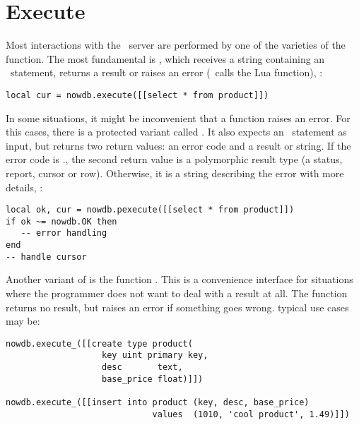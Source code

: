 
\clearpage
\section{Execute}
Most interactions with the \nowdb\ server
are performed by one of the varieties of
the  function.
The most fundamental is ,
which receives a string containing an \sql\ statement,
returns a result or raises an error (\ie\ calls
the Lua  function), \eg:

\begin{lua}
\begin{lstlisting}
local cur = nowdb.execute([[select * from product]])
\end{lstlisting}
\end{lua}

In some situations, it might be inconvenient
that a function raises an error.
For this cases, there is a protected
variant called .
It also expects an \sql\ statement
as input, but returns two return values:
an error code and a result or string.
If the error code is .,
the second return value
is a polymorphic result type
(a status, report, cursor or row).
Otherwise, it is a string describing
the error with more details, \eg:

\begin{lua}
\begin{lstlisting}
local ok, cur = nowdb.pexecute([[select * from product]])
if ok ~= nowdb.OK then
   -- error handling
end
-- handle cursor
\end{lstlisting}
\end{lua}

Another variant of  is
the function .
This is a convenience interface for
situations where the programmer does
not want to deal with a result at all.
The function returns no result, but
raises an error if something goes wrong.
typical use cases may be:

\begin{lua}
\begin{lstlisting}
nowdb.execute_([[create type product(
                   key uint primary key,
                   desc       text,
                   base_price float)]])

nowdb.execute_([[insert into product (key, desc, base_price)
                             values  (1010, 'cool product', 1.49)]])
\end{lstlisting}
\end{lua}

